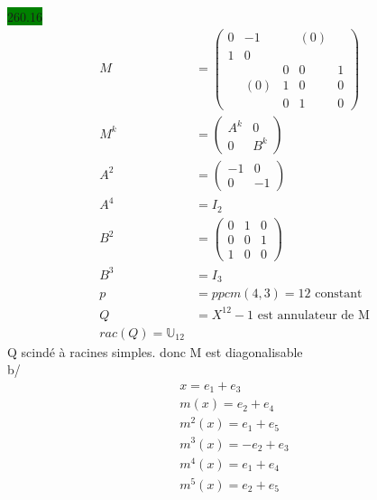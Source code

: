 \documentclass{article}
\begin{document}
\noindent \colorbox{green}{260.16}\\
\begin{align*}
    M &= \begin{pmatrix}
        0&-1& & (0) & \\
        1 & 0 & & \\
         & & 0 & 0 & 1\\
        &(0)& 1 & 0 & 0 \\
        & & 0 & 1 & 0
    \end{pmatrix}\\
    M^k &= \begin{pmatrix}
        A^k & 0 \\
        0 & B^k
    \end{pmatrix}\\
    A^2 &= \begin{pmatrix}
        -1 & 0 \\ 0 & -1
    \end{pmatrix}\\
    A^4 &= I_2\\
    B^2 &= \begin{pmatrix}
        0 & 1 & 0 \\ 0 & 0 & 1\\ 1& 0 & 0
    \end{pmatrix}\\
    B^3 &= I_3\\
    p &= ppcm(4,3) = 12 \text{ constant }\\
    Q &= X^12-1 \text{ est annulateur de M}\\
    rac(Q) = \mathbb{U}_{12}
\end{align*}
Q scindé à racines simples. donc M est diagonalisable\\
b/ \begin{align*}
    x = e_1 + e_3\\
    m(x) = e_2 + e_4 \\
    m^2 (x) = e_1 + e_5\\
    m^3(x) = -e_2 + e_3\\
    m^4(x) = e_1 + e_4 \\
    m^5(x) = e_2 + e_5 
\end{align*}
\end{document}
